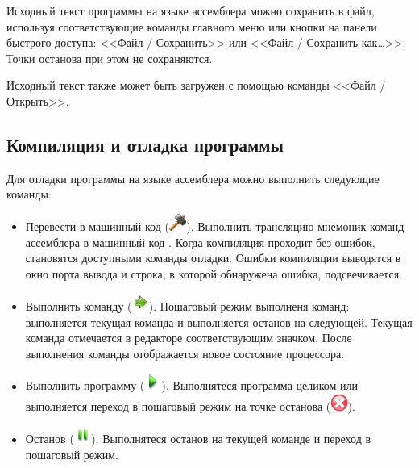 Исходный текст программы на языке ассемблера {\MyProc} можно сохранить в файл, используя соответствующие команды главного меню или кнопки на панели быстрого доступа: <<Файл / Сохранить>> или <<Файл / Сохранить как\ldots>>. Точки останова при этом не сохраняются.

Исходный текст также может быть загружен с помощью команды <<Файл / Открыть>>.


\subsection{Компиляция и отладка программы}
\label{ch:asm:debug}

Для отладки программы на языке ассемблера {\MyProc} можно выполнить следующие команды:
\begin{itemize}
    \item Перевести в машинный код (\includegraphics[width=16pt]{fig/r8asm/image/compile}). Выполнить трансляцию мнемоник команд ассемблера {\MyProc} в машинный код {\MyProc}. Когда компиляция проходит без ошибок, становятся доступными команды отладки. Ошибки компиляции выводятся в окно порта вывода и строка, в которой обнаружена ошибка, подсвечивается.
    
    \item Выполнить команду (\includegraphics[width=16pt]{fig/r8asm/image/step}). Пошаговый режим выполненя команд: выполняется текущая команда и выполняется останов на следующей. Текущая команда отмечается в редакторе соответствующим значком. После выполнения команды отображается новое состояние процессора.
    
    \item Выполнить программу (\includegraphics[width=16pt]{fig/r8asm/image/run}). Выполнятеся программа целиком или выполняется переход в пошаговый режим на точке останова (\includegraphics[width=16pt]{fig/r8asm/image/breakpoint}). 
    
    \item Останов (\includegraphics[width=16pt]{fig/r8asm/image/stop}). Выполнятеся останов на текущей команде и переход в пошаговый режим.
    

\end{itemize}
